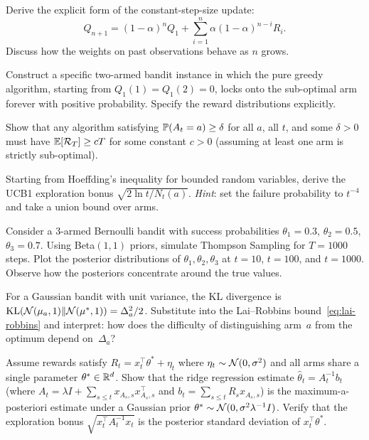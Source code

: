 \begin{exercise}
Derive the explicit form of the constant-step-size update:
\[
Q_{n+1} = (1-\alpha)^n Q_1 + \sum_{i=1}^{n}\alpha(1-\alpha)^{n-i}R_i.
\]
Discuss how the weights on past observations behave as $n$ grows.
\end{exercise}

\begin{exercise}
Construct a specific two-armed bandit instance in which the pure greedy algorithm, starting from $Q_1(1)=Q_1(2)=0$, locks onto the sub-optimal arm forever with positive probability.  Specify the reward distributions explicitly.
\end{exercise}

\begin{exercise}
Show that any algorithm satisfying $\mathbb{P}(A_t=a)\ge\delta$ for all $a$, all $t$, and some $\delta>0$ must have $\operatorname{\mathbb{E}}[\mathcal{R}_T]\ge cT$ for some constant $c>0$ (assuming at least one arm is strictly sub-optimal).
\end{exercise}

\begin{exercise}
\label{ex:ucb-bonus}
Starting from Hoeffding's inequality for bounded random variables, derive the UCB1 exploration bonus $\sqrt{2\ln t/N_t(a)}$.  \emph{Hint}: set the failure probability to $t^{-4}$ and take a union bound over arms.
\end{exercise}

\begin{exercise}
\label{ex:thompson-sim}
Consider a $3$-armed Bernoulli bandit with success probabilities $\theta_1=0.3$, $\theta_2=0.5$, $\theta_3=0.7$.  Using Beta$(1,1)$ priors, simulate Thompson Sampling for $T=1000$ steps.  Plot the posterior distributions of $\theta_1,\theta_2,\theta_3$ at $t=10$, $t=100$, and $t=1000$.  Observe how the posteriors concentrate around the true values.
\end{exercise}

\begin{exercise}
\label{ex:lai-robbins-gaussian}
For a Gaussian bandit with unit variance, the KL divergence is $\mathrm{KL}(\mathcal{N}(\mu_a,1)\|\mathcal{N}(\mu^*,1))=\Delta_a^2/2$.  Substitute into the Lai--Robbins bound~\eqref{eq:lai-robbins} and interpret: how does the difficulty of distinguishing arm~$a$ from the optimum depend on~$\Delta_a$?
\end{exercise}

\begin{exercise}
\label{ex:linucb}
Assume rewards satisfy $R_t = x_t^\top\theta^* + \eta_t$ where $\eta_t\sim\mathcal{N}(0,\sigma^2)$ and all arms share a single parameter $\theta^*\in\mathbb{R}^d$.  Show that the ridge regression estimate $\hat\theta_t = A_t^{-1}b_t$ (where $A_t=\lambda I + \sum_{s\le t}x_{A_s,s}x_{A_s,s}^\top$ and $b_t=\sum_{s\le t}R_s x_{A_s,s}$) is the maximum-a-posteriori estimate under a Gaussian prior $\theta^*\sim\mathcal{N}(0,\sigma^2\lambda^{-1}I)$.  Verify that the exploration bonus $\sqrt{x_t^\top A_t^{-1}x_t}$ is the posterior standard deviation of $x_t^\top\theta^*$.
\end{exercise}
